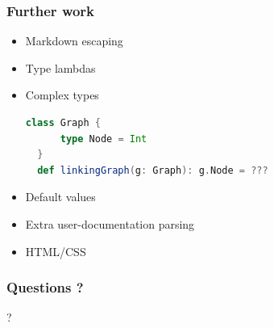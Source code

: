 \documentclass{beamer}
\begin{document}
\begin{frame}[fragile]
  \frametitle{Further work}
  \pause
  \begin{itemize}
    \item Markdown escaping \pause
    \item Type lambdas \pause
    \item Complex types
\begin{lstlisting}[language=scala]
  class Graph {
      type Node = Int
  }
  def linkingGraph(g: Graph): g.Node = ???    
\end{lstlisting}\pause
    \item Default values \pause
    \item Extra user-documentation parsing \pause
    \item HTML/CSS
  \end{itemize}
\end{frame}

\begin{frame}
  \frametitle{Questions ?}
  \begin{center}
    \Huge{?}
  \end{center}
\end{frame}
\end{document}
